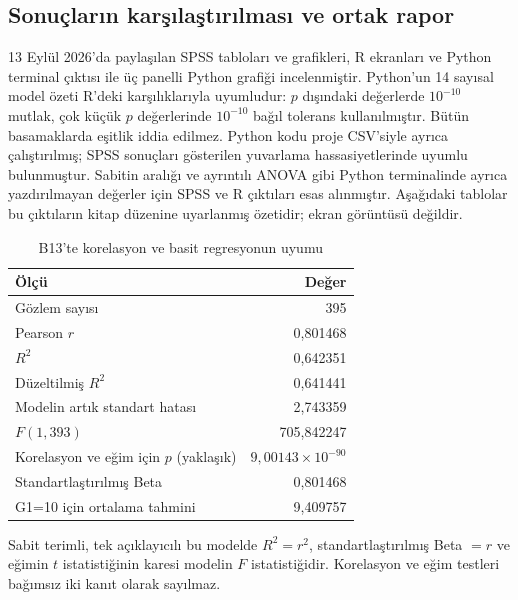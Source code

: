 \subsection{Sonuçların karşılaştırılması ve ortak rapor}
13 Eylül 2026'da paylaşılan SPSS tabloları ve grafikleri, R ekranları
ve Python terminal çıktısı ile üç panelli Python grafiği incelenmiştir.
Python'un 14 sayısal model özeti R'deki karşılıklarıyla uyumludur:
$p$ dışındaki değerlerde $10^{-10}$ mutlak, çok küçük $p$ değerlerinde
$10^{-10}$ bağıl tolerans kullanılmıştır. Bütün basamaklarda eşitlik
iddia edilmez. Python kodu proje CSV'siyle ayrıca çalıştırılmış;
SPSS sonuçları gösterilen yuvarlama hassasiyetlerinde uyumlu bulunmuştur.
Sabitin aralığı ve ayrıntılı ANOVA gibi Python terminalinde ayrıca
yazdırılmayan değerler için SPSS ve R çıktıları esas alınmıştır.
Aşağıdaki tablolar bu çıktıların kitap düzenine uyarlanmış özetidir;
ekran görüntüsü değildir.

\begin{table}[H]
\centering
\caption{B13'te korelasyon ve basit regresyonun uyumu}
\label{tab:b13-dogrulanmis-uyum}
\begin{tabular}{@{}lr@{}}
\toprule
Ölçü & Değer \\
\midrule
Gözlem sayısı & 395 \\
Pearson $r$ & 0,801468 \\
$R^2$ & 0,642351 \\
Düzeltilmiş $R^2$ & 0,641441 \\
Modelin artık standart hatası & 2,743359 \\
$F(1,393)$ & 705,842247 \\
Korelasyon ve eğim için $p$ (yaklaşık) & $9{,}00143\times10^{-90}$ \\
Standartlaştırılmış Beta & 0,801468 \\
G1=10 için ortalama tahmini & 9,409757 \\
\bottomrule
\end{tabular}
\par\smallskip
{\footnotesize Sabit terimli, tek açıklayıcılı bu modelde
$R^2=r^2$, standartlaştırılmış Beta $=r$ ve eğimin $t$ istatistiğinin
karesi modelin $F$ istatistiğidir. Korelasyon ve eğim testleri
bağımsız iki kanıt olarak sayılmaz.\par}
\end{table}

